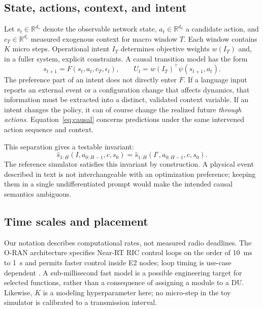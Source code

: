 \documentclass[10pt,twocolumn]{article}
\newcommand{\R}{\mathbb{R}}
\begin{document}
\subsection{State, actions, context, and intent}
Let $s_t\in\R^{d_s}$ denote the observable network state, $a_t\in\R^{d_a}$ a
candidate action, and $c_T\in\R^{d_c}$ measured exogenous context for macro
window $T$. Each window contains $K$ micro steps. Operational intent $I_T$
determines objective weights $w(I_T)$ and, in a fuller system, explicit
constraints. A causal transition model has the form
\begin{equation}
 s_{t+1}=F(s_t,a_t,c_T,\epsilon_t),\qquad
 U_t=w(I_T)^\top\psi(s_{t+1},a_t).
 \label{eq:causal}
\end{equation}
The preference part of an intent does not directly enter $F$. If a language
input reports an external event or a configuration change that affects
dynamics, that information must be extracted into a distinct, validated
context variable. If an intent changes the policy, it can of course change the
realized future \emph{through actions}. Equation~\eqref{eq:causal} concerns
predictions under the same intervened action sequence and context.

This separation gives a testable invariant:
\begin{equation}
 \hat{s}_{1:H}(I,a_{0:H-1},c,s_0)
 =\hat{s}_{1:H}(I',a_{0:H-1},c,s_0).
 \label{eq:invariant}
\end{equation}
The reference simulator satisfies this invariant by construction. A physical
event described in text is not interchangeable with an optimization preference;
keeping them in a single undifferentiated prompt would make the intended causal
semantics ambiguous.

\subsection{Time scales and placement}
Our notation describes computational rates, not measured radio deadlines.
The O-RAN architecture specifies Near-RT RIC control loops on the order of
10~ms to 1~s and permits faster control inside E2 nodes; loop timing is use-case
dependent \cite{oran2026}. A sub-millisecond fast model is a possible engineering
target for selected functions, rather than a consequence of assigning a module
to a DU. Likewise, $K$ is a modeling hyperparameter here; no micro-step in the
toy simulator is calibrated to a transmission interval.


\end{document}
